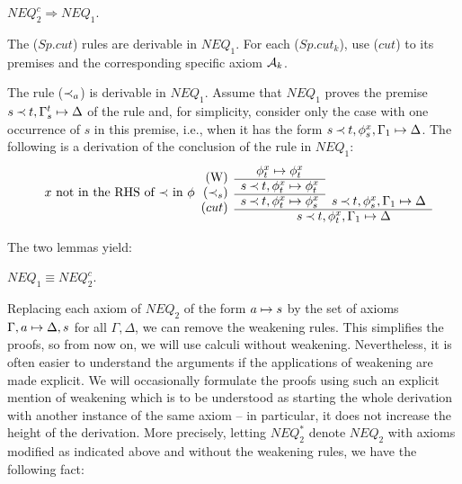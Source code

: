\begin{LEMMA} $NEQ_2^c \Rightarrow NEQ_1$.\end{LEMMA}
\begin{PROOF}
\begin{LS}
\item The ($Sp.cut$) rules  are derivable in $NEQ_1$.
For each ($Sp.cut_k$), use ($cut$) to its premises and the 
corresponding specific axiom ${\cal {A}}_k$.
\item  The rule  ($\mathbin{\prec}_a$) is derivable in $NEQ_1$.
Assume that $NEQ_1$ proves the premise 
$s\mathbin{\prec} t,\Gamma^t_s\mathrel{\mapsto}\Delta$ of the rule and, for simplicity, 
consider only the case with one occurrence of $s$ in this premise, i.e., when
it has the form $s\mathbin{\prec} t, \phi_s^x,\Gamma_1\mathrel{\mapsto}\Delta$. 
The following is a derivation of
the conclusion of the rule in $NEQ_1$:
\[ \begin{array}{rcc}
\raisebox{-1.2ex}[1.5ex][0ex]{(W)} & \phi_t^x\Seq \phi_t^x &  \\ \cline{2-2}
\raisebox{-1.2ex}[1.5ex][0ex]{
$x$ not in the RHS of $\Incl$ in $\phi$\ \ ($\Incl_s$)} 
 & s\Incl t,\phi_t^x\Seq \phi_t^x & 
      \\ \cline{2-2}
 \raisebox{-1.2ex}[1.5ex][0ex]{($cut$)} 
& s\Incl t, \phi_t^x \Seq \phi_s^x & s\Incl t, \phi_s^x, \Gamma_1\Seq\Delta 
   \\ \cline{2-3}
& \multicolumn{2}{c}{\ \ \ \ \ s\Incl t,\phi_t^x,\Gamma_1\Seq\Delta}
\end{array} \]
\end{LS}
\end{PROOF}
\noindent
The two lemmas yield:
\begin{LEMMA}\label{le:neq1isneq2} $NEQ_1 \equiv NEQ_2^c$.\end{LEMMA}
\noindent
Replacing each axiom of $NEQ_2$ of the form $a\mathrel{\mapsto} s$ by
the set of axioms $\Gamma,a \mathrel{\mapsto}\Delta, s$ for all $\Gamma, \Delta$, we can
remove the weakening rules. This simplifies the proofs, so from now on, we will use 
calculi without weakening. Nevertheless, it is often easier to understand the arguments if
the applications of weakening are made explicit. We will occasionally
formulate the proofs using such an explicit mention of weakening which is to
be understood as starting the whole derivation with another instance of the
same axiom -- in particular, it does not increase the height of the
derivation. More precisely, letting $NEQ_2^*$ denote $NEQ_2$ with axioms 
modified as indicated above and without the weakening rules, we have the following fact:

